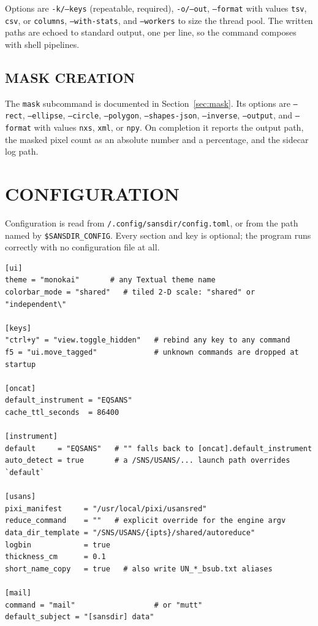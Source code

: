 \documentclass[tm]{ornltm}
\newcommand{\hme}{\raisebox{0.4ex}{\texttildelow}}
\begin{document}
Options are \texttt{-k/--keys} (repeatable, required), \texttt{-o/--out},
\texttt{--format} with values \texttt{tsv}, \texttt{csv}, or \texttt{columns},
\texttt{--with-stats}, and \texttt{--workers} to size the thread pool. The
written paths are echoed to standard output, one per line, so the command
composes with shell pipelines.

\subsection{MASK CREATION}

The \texttt{mask} subcommand is documented in Section~\ref{sec:mask}. Its options
are \texttt{--rect}, \texttt{--ellipse}, \texttt{--circle}, \texttt{--polygon},
\texttt{--shapes-json}, \texttt{--inverse}, \texttt{--output}, and
\texttt{--format} with values \texttt{nxs}, \texttt{xml}, or \texttt{npy}. On
completion it reports the output path, the masked pixel count as an absolute
number and a percentage, and the sidecar log path.

\section{CONFIGURATION}
\label{sec:config}

Configuration is read from \texttt{\hme/.config/sansdir/config.toml}, or from the
path named by \texttt{\$SANSDIR\_CONFIG}. Every section and key is optional; the
program runs correctly with no configuration file at all.

\begin{lstlisting}
[ui]
theme = "monokai"       # any Textual theme name
colorbar_mode = "shared"   # tiled 2-D scale: "shared" or "independent\"

[keys]
"ctrl+y" = "view.toggle_hidden"   # rebind any key to any command
f5 = "ui.move_tagged"             # unknown commands are dropped at startup

[oncat]
default_instrument = "EQSANS"
cache_ttl_seconds  = 86400

[instrument]
default     = "EQSANS"   # "" falls back to [oncat].default_instrument
auto_detect = true       # a /SNS/USANS/... launch path overrides `default`

[usans]
pixi_manifest     = "/usr/local/pixi/usansred"
reduce_command    = ""   # explicit override for the engine argv
data_dir_template = "/SNS/USANS/{ipts}/shared/autoreduce"
logbin            = true
thickness_cm      = 0.1
short_name_copy   = true   # also write UN_*_bsub.txt aliases

[mail]
command = "mail"                  # or "mutt"
default_subject = "[sansdir] data"
\end{lstlisting}
\end{document}
